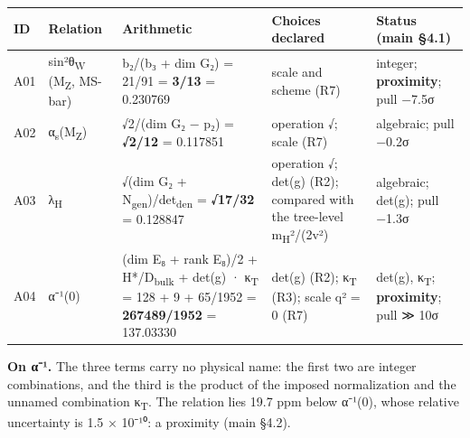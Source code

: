 \documentclass[11pt,a4paper]{article}
\begin{document}
{\footnotesize\setlength{\tabcolsep}{3pt}
\begin{longtable}[]{@{}
  >{\raggedright\arraybackslash}p{}
  >{\raggedright\arraybackslash}p{}
  >{\raggedright\arraybackslash}p{}
  >{\raggedright\arraybackslash}p{}
  >{\raggedright\arraybackslash}p{}@{}}
\toprule\noalign{}
\begin{minipage}[b]{\linewidth}\raggedright
ID
\end{minipage} & \begin{minipage}[b]{\linewidth}\raggedright
Relation
\end{minipage} & \begin{minipage}[b]{\linewidth}\raggedright
Arithmetic
\end{minipage} & \begin{minipage}[b]{\linewidth}\raggedright
Choices declared
\end{minipage} & \begin{minipage}[b]{\linewidth}\raggedright
Status (main §4.1)
\end{minipage} \\
\midrule\noalign{}
\endhead
\bottomrule\noalign{}
\endlastfoot
A01 & sin²θ\textsubscript{W} (M\textsubscript{Z}, MS-bar) & b₂/(b₃ + dim G₂) = 21/91 = \textbf{3/13} = 0.230769 & scale and scheme (R7) & integer; \textbf{proximity}; pull −7.5σ \\
A02 & α\textsubscript{s}(M\textsubscript{Z}) & √2/(dim G₂ − p₂) = \textbf{√2/12} = 0.117851 & operation √; scale (R7) & algebraic; pull −0.2σ \\
A03 & λ\textsubscript{H} & √(dim G₂ + N\textsubscript{gen})/det\textsubscript{den} = \textbf{√17/32} = 0.128847 & operation √; det(g) (R2); compared with the tree-level m\textsubscript{H}²/(2v²) & algebraic; det(g); pull −1.3σ \\
A04 & α⁻¹(0) & (dim E₈ + rank E₈)/2 + H*/D\textsubscript{bulk} + det(g) · κ\textsubscript{T} = 128 + 9 + 65/1952 = \textbf{267489/1952} = 137.03330 & det(g) (R2); κ\textsubscript{T} (R3); scale q² = 0 (R7) & det(g), κ\textsubscript{T}; \textbf{proximity}; pull ≫ 10σ \\
\end{longtable}}

\textbf{On α⁻¹.} The three terms carry no physical name: the first two are integer combinations, and the third is the product of the imposed normalization and the unnamed combination κ\textsubscript{T}. The relation lies 19.7 ppm below α⁻¹(0), whose relative uncertainty is 1.5 × 10⁻¹⁰: a proximity (main §4.2).
\end{document}
